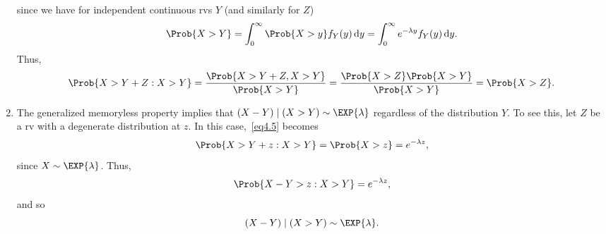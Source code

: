 \begin{enumerate}[(1)]
          since we have for independent continuous rvs $ Y $ (and similarly for $ Z $)
          \[ \Prob{X>Y}=\int_{0}^{\infty}\Prob{X>y}f_Y(y)\odif{y}=\int_{0}^{\infty}e^{-\lambda y}f_Y(y)\odif{y}. \]
          Thus,
          \[ \Prob{X>Y+Z\given X>Y}=\frac{\Prob{X>Y+Z,X>Y}}{\Prob{X>Y}}=\frac{\Prob{X>Z}\Prob{X>Y}}{\Prob{X>Y}}=\Prob{X>Z}. \]
    \item The generalized memoryless property implies that $ (X-Y)\mid(X>Y)\sim \EXP{\lambda} $ regardless of the distribution $ Y $. To see this,
          let $ Z $ be a rv with a degenerate distribution at $ z $. In this case,~\ref{eq4.5} becomes
          \[ \Prob{X>Y+z\given X>Y}=\Prob{X>z}=e^{-\lambda z}, \]
          since $ X \sim \EXP{\lambda} $. Thus,
          \[ \Prob{X-Y>z\given X>Y}=e^{-\lambda z}, \]
          and so
          \[ (X-Y)\mid(X>Y)\sim \EXP{\lambda}.  \]
\end{enumerate}
